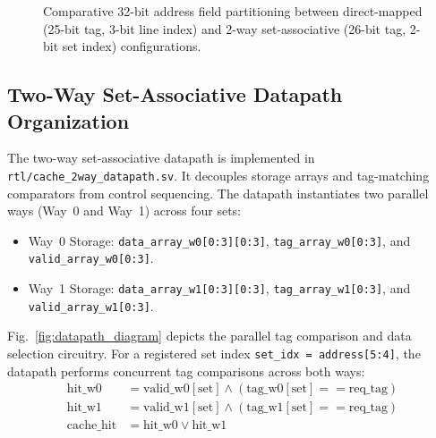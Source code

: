 \documentclass[conference]{IEEEtran}
\begin{document}
\begin{figure}[htbp]
{%
}
\caption{Comparative 32-bit address field partitioning between direct-mapped (25-bit tag, 3-bit line index) and 2-way set-associative (26-bit tag, 2-bit set index) configurations.}
\label{fig:addr_mapping}
\end{figure}

\subsection{Two-Way Set-Associative Datapath Organization}
The two-way set-associative datapath is implemented in \texttt{rtl/cache\_2way\_datapath.sv}. It decouples storage arrays and tag-matching comparators from control sequencing. The datapath instantiates two parallel ways (Way~0 and Way~1) across four sets:
\begin{itemize}
    \item Way~0 Storage: \texttt{data\_array\_w0[0:3][0:3]}, \texttt{tag\_array\_w0[0:3]}, and \texttt{valid\_array\_w0[0:3]}.
    \item Way~1 Storage: \texttt{data\_array\_w1[0:3][0:3]}, \texttt{tag\_array\_w1[0:3]}, and \texttt{valid\_array\_w1[0:3]}.
\end{itemize}

Fig.~\ref{fig:datapath_diagram} depicts the parallel tag comparison and data selection circuitry. For a registered set index \texttt{set\_idx = address[5:4]}, the datapath performs concurrent tag comparisons across both ways:
\begin{align}
\text{hit\_w0} &= \text{valid\_w0}[\text{set}] \land (\text{tag\_w0}[\text{set}] == \text{req\_tag}) \\
\text{hit\_w1} &= \text{valid\_w1}[\text{set}] \land (\text{tag\_w1}[\text{set}] == \text{req\_tag}) \\
\text{cache\_hit} &= \text{hit\_w0} \lor \text{hit\_w1}
\end{align}
\end{document}

